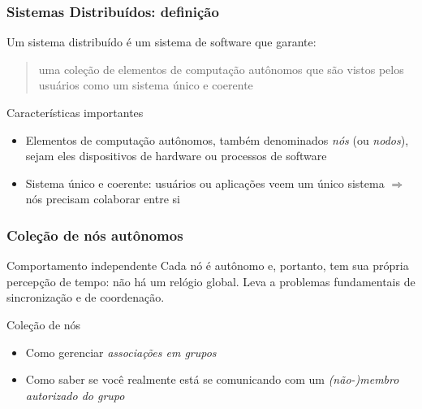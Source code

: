 \documentclass[Ligatures=TeX,table,brazil,svgnames,usetotalslideindicator,compress,10pt]{beamer}
\begin{document}
\begin{frame}
  \frametitle{Sistemas Distribuídos: definição}

  Um sistema distribuído é um sistema de software que garante:

  \begin{quote}
    uma coleção de \alert{elementos de computação autônomos} que são vistos pelos usuários como um \alert{sistema único e coerente}
  \end{quote}

  \begin{block}{Características importantes}
    \begin{itemize}
    \item Elementos de computação autônomos, também denominados \emph{nós} (ou \emph{nodos}), sejam eles dispositivos de hardware ou processos de software
    \item Sistema único e coerente: usuários ou aplicações veem um único sistema $\Rightarrow$ nós precisam \alert{colaborar} entre si
    \end{itemize}
  \end{block}

\end{frame}

\begin{frame}
  \frametitle{Coleção de nós autônomos}
  \begin{block}{Comportamento independente}
    Cada nó é autônomo e, portanto, \alert{tem sua própria percepção de tempo}: não há um \alert{relógio global}. Leva a problemas fundamentais de sincronização e de coordenação.
  \end{block}

  \begin{block}{Coleção de nós}
    \begin{itemize}
    \item Como gerenciar \emph{associações em grupos}
    \item Como saber se você realmente está se comunicando com um \emph{(não-)membro autorizado do grupo}
    \end{itemize}
  \end{block}
\end{frame}
\end{document}
